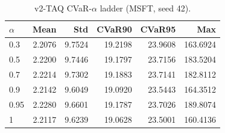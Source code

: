 \begin{table}[H]
    \centering
    \caption{v2-TAQ CVaR-$\alpha$ ladder (MSFT, seed 42).}
    \label{tab:v2_taq_alpha}
    \begin{tabular}{@{}lrrrrr@{}}
        \toprule
        $\alpha$ & Mean & Std & CVaR90 & CVaR95 & Max \\
        \midrule
        0.3 & 2.2076 & 9.7524 & 19.2198 & 23.9608 & 163.6924 \\
        0.5 & 2.2200 & 9.7446 & 19.1797 & 23.7156 & 183.5204 \\
        0.7 & 2.2214 & 9.7302 & 19.1883 & 23.7141 & 182.8112 \\
        0.9 & 2.2142 & 9.6049 & 19.0920 & 23.5443 & 164.3512 \\
        0.95 & 2.2280 & 9.6601 & 19.1787 & 23.7026 & 189.8074 \\
        1 & 2.2117 & 9.6239 & 19.0628 & 23.5001 & 160.4136 \\
        \bottomrule
    \end{tabular}
\end{table}
